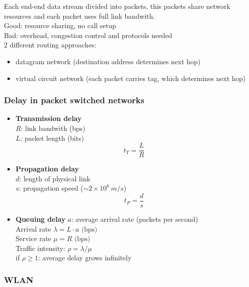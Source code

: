 \documentclass[10pt, a4paper, twocolumn]{scrartcl}
\begin{document}
Each end-end data stream divided into packets, this packets share network resources and each packet uses full link bandwith.\\

Good: resource sharing, no call setup\\
Bad: overhead, congestion control and protocols needed\\

2 different routing approaches:
\begin{itemize}
	\item datagram network (destination address determines next hop)
	\item virtual circuit network (each packet carries tag, which determines next hop)
\end{itemize}

\subsubsection{Delay in packet switched networks}

\begin{itemize}
	\item \textbf{Transmission delay}\\
		$R$: link bandwith (bps)\\
		$L$: packet length (bits)
		\begin{displaymath}
			t_T = \frac{L}{R}
		\end{displaymath}
	\item \textbf{Propagation delay}\\
		$d$: length of physical link\\
		$s$: propagation speed ($\sim 2\times 10^8\:m/s$)\\
		\begin{displaymath}
			t_P = \frac{d}{s}
		\end{displaymath}
	\item \textbf{Queuing delay}
		$a$: average arrival rate (packets per second)\\
		Arrival rate $\lambda = L\cdotp a \mbox{ (bps)}$\\
		Service rate $\mu = R \mbox{ (bps)}$\\
		Traffic intensity: $\rho = \lambda / \mu$\\
		if $\rho \geq 1$: average delay grows infinitely
\end{itemize}

\subsubsection{WLAN}
\end{document}
